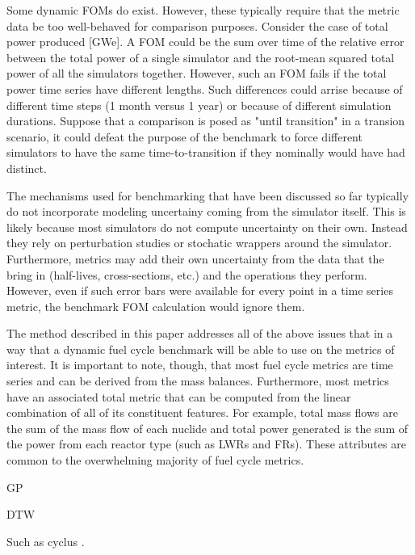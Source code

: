 Some dynamic FOMs do exist. However, these typically require that the metric
data be too well-behaved for comparison purposes. Consider the case of total
power produced [GWe]. A FOM could be the sum over time of the relative error 
between the total power of a single simulator and the root-mean squared total power
of all the simulators together. However, such an FOM fails if the total power
time series have different lengths. Such differences could arrise because 
of different time steps (1 month versus 1 year) or because of different 
simulation durations. Suppose that a comparison is posed as "until transition"
in a transion scenario, it could defeat the purpose of the benchmark to
force different simulators to have the same time-to-transition if they 
nominally would have had distinct. 
 
The mechanisms used for benchmarking that have been discussed so far typically
do not incorporate modeling uncertainy coming from the simulator itself.
This is likely because most simulators do not compute uncertainty on their 
own. Instead they rely on perturbation studies or stochatic wrappers around 
the simulator. Furthermore, metrics may add their own uncertainty from the 
data that the bring in (half-lives, cross-sections, etc.) and the 
operations they perform. However, even if such error bars were available for
every point in a time series metric, the benchmark FOM calculation would 
ignore them.

The method described in this paper addresses all of the above issues that 
in a way that a dynamic fuel cycle benchmark will be able to use on the 
metrics of interest. It is important to note, though, that most fuel cycle 
metrics are time series and can be derived from the mass balances. 
Furthermore, most metrics have an associated total metric that can be 
computed from the linear combination of all of its constituent features. 
For example, total mass flows are the sum of the mass flow of each nuclide
and total power generated is the sum of the power from each reactor type 
(such as LWRs and FRs).  These attributes are common to the overwhelming 
majority of fuel cycle metrics.

GP

DTW

Such as cyclus \cite{cyclus_v1_2}.